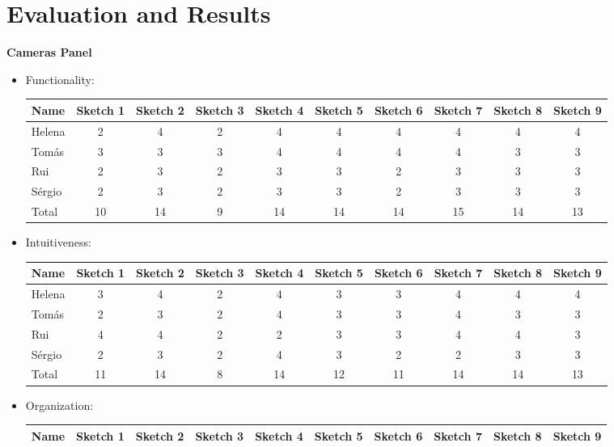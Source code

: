 \section{Evaluation and Results}
\textbf{Cameras Panel}
\begin{itemize}
    \item Functionality: 
\begin{center}
\begin{table}[H]
\begin{tabular}{l*{9}{c}}
Name & Sketch 1 & Sketch 2 & Sketch 3 & Sketch 4 
& Sketch 5 & Sketch 6 & Sketch 7 & Sketch 8 & Sketch 9 \\
\hline 
Helena & 2 & 4 & 2 & 4 & 4 & 4 & 4 & 4 & 4 \\
Tomás & 3 & 3 & 3 & 4 & 4 & 4 & 4 & 3 & 3 \\ 
Rui & 2 & 3 & 2 & 3 & 3 & 2 & 3 & 3 & 3 \\ 
Sérgio & 2 & 3 & 2 & 3 & 3 & 2 & 3 & 3 & 3 \\ 
\hline
Total & 10 & 14 & 9 & 14 & 14 & 14 & 15 & 14 & 13 \\
\end{tabular}
\end{table}
\end{center}
\item Intuitiveness: 
\begin{table}[H]
\begin{tabular}{l*{9}{c}}
    Name & Sketch 1 & Sketch 2 & Sketch 3 & Sketch 4 
    & Sketch 5 & Sketch 6 & Sketch 7 & Sketch 8 & Sketch 9 \\
    \hline 
    Helena & 3 & 4 & 2 & 4 & 3 & 3 & 4 & 4 & 4 \\
    Tomás & 2 & 3 & 2 & 4 & 3 & 3 & 4 & 3 & 3 \\ 
    Rui & 4 & 4 & 2 & 2 & 3 & 3 & 4 & 4 & 3 \\ 
    Sérgio & 2 & 3 & 2 & 4 & 3 & 2 & 2 & 3 & 3 \\ 
    \hline
    Total & 11 & 14 & 8 & 14 & 12 & 11 & 14 & 14 & 13 \\
\end{tabular}
\end{table}
\item Organization:
\begin{table}[H]
    \begin{tabular}{l*{9}{c}}
        Name & Sketch 1 & Sketch 2 & Sketch 3 & Sketch 4 
        & Sketch 5 & Sketch 6 & Sketch 7 & Sketch 8 & Sketch 9 \\
        \hline 

\end{tabular}
\end{table}
\end{itemize}
